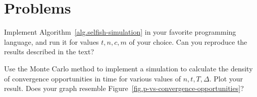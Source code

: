 \section*{Problems}

\begin{problems}
  \item Implement Algorithm~\ref{alg.selfish-simulation} in your favorite programming language,
        and run it for values $t, n, c, m$ of your choice. Can you reproduce the results described
        in the text?\label{problem.selfish-simulation}
  \item Use the Monte Carlo method to implement a simulation to calculate the density of
        convergence opportunities in time for various values of $n, t, T, \Delta$. Plot your
        result. Does your graph resemble Figure~\ref{fig.p-vs-convergence-opportunities}?








\end{problems}

